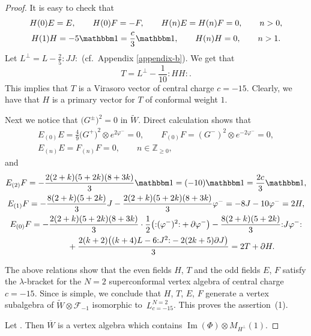 \documentclass[pdftex]{sigma}
\numberwithin{equation}{section}
\newcommand{\F}{\mathcal F}
\begin{document}
\begin{proof}


It is easy to check that
\begin{gather*}
 H(0) E = E, \qquad H(0) F =-F, \qquad H(n) E = H(n) F =0, \qquad n >0, \\
 H(1) H = - 5 {\mathbbm 1} = \frac{c}{3} {\mathbbm 1},\qquad H(n) H =0, \qquad n >1.
\end{gather*}
 Let $L^{\perp} = L- \frac{2}{5} {:}J J{:}$ (cf.\ Appendix \ref{appendix-b}). We get that
\[
 T = L^{\perp} -\frac{1}{10} {:}H H{:}.
 \]
This implies that $T$ is a Virasoro vector of central charge $c=-15$. Clearly, we have that $H$ is a primary vector for $T$ of conformal weight $1$.


 Next we notice that $\bigl(G^\pm \bigr)^2 =0$ in $\widetilde W$. Direct calculation shows that
 \begin{gather*}
 E_{(0)} E = \frac{4}{9} {\bigl( G^+ \bigr)}^2 \otimes e^{2 \varphi^-} =0, \qquad F_{(0)}F = {( G^-)}^2 \otimes e^{-2 \varphi^-} =0, \\
 E_{(n)} E = F_{(n)} F =0, \qquad n\in {\mathbb Z}_{\ge 0},
\end{gather*}
and
\begin{gather*}
	E_{(2)} F = -\frac{2 (2 + k)(5 + 2k)(8 + 3k)}{3} {\mathbbm 1} =(-10) {\mathbbm 1} = \frac{2 c}{3} {\mathbbm 1}, \\
E_{(1)} F = -\frac{ 8(2 + k)(5 + 2k)}{3} J - \frac{2 (2 + k)(5 + 2k)(8 + 3k)}{3} \varphi^- = -8 J - 10 \varphi^- = 2 H, \\
 E_{(0)} F = - \frac{2 (2 + k)(5 + 2k)(8 + 3k)}{3}\cdot\frac{1}{2}\bigl({:}( \varphi^-)^2{:}+\partial\varphi^-\bigr)-\frac{ 8(2 + k)(5 + 2k)}{3} {:}J \varphi^-{:} \\
 \phantom{E_{(0)} F =}{}+\frac{2(k+2) \bigl((k+4)L-6{:}J^2{:}-2(2k+5) \partial J\bigr)}{3} = 2T + \partial H.
\end{gather*}

The above relations show that the even fields $H$, $ T$ and the odd fields $E$, $F$ satisfy the $\lambda$-bracket for the $N=2$ superconformal vertex algebra of central charge $c=-15$. Since  is simple, we conclude that $H$, $T$, $E$, $F$ generate a vertex subalgebra of $\widetilde W \otimes \F_{-1}$ isomorphic to~$L^{N=2}_{c=-15}$. This proves the assertion~(1).

 Let . Then $\overline{W}$ is a vertex algebra which contains $ \operatorname{Im} (\Phi)\otimes M_{H^{\perp}} (1)$.




\end{proof}
\end{document}

